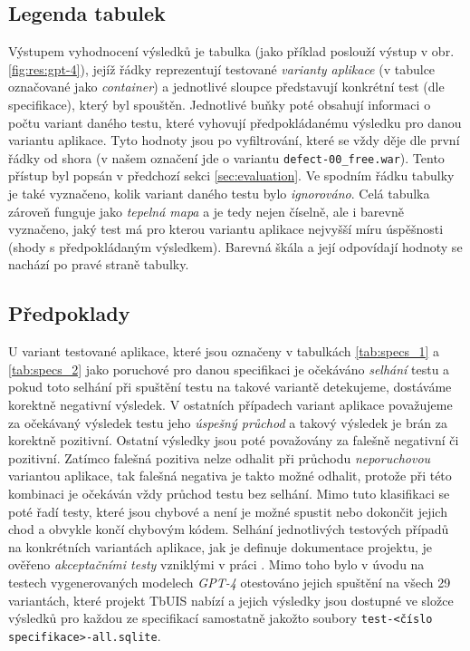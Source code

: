 \documentclass[czech, ma, kiv, he, iso690numb, pdf, viewonly]{fasthesis}
\begin{document}
        \subsection{Legenda tabulek} \label{sec:plot_legend}

        Výstupem vyhodnocení výsledků je tabulka (jako příklad poslouží výstup v obr. \ref{fig:res:gpt-4}), jejíž řádky reprezentují testované \textit{varianty aplikace} (v tabulce označované jako \emph{container}) a jednotlivé sloupce představují konkrétní test (dle specifikace), který byl spouštěn. Jednotlivé buňky poté obsahují informaci o počtu variant daného testu, které vyhovují předpokládanému výsledku pro danou variantu aplikace. Tyto hodnoty jsou po vyfiltrování, které se vždy děje dle první řádky od shora (v našem označení jde o variantu \verb|defect-00_free.war|). Tento přístup byl popsán v předchozí sekci \ref{sec:evaluation}. Ve spodním řádku tabulky je také vyznačeno, kolik variant daného testu bylo \emph{ignorováno}. Celá tabulka zároveň funguje jako \textit{tepelná mapa} a je tedy nejen číselně, ale i barevně vyznačeno, jaký test má pro kterou variantu aplikace nejvyšší míru úspěšnosti (shody s předpokládaným výsledkem). Barevná škála a její odpovídají hodnoty se nachází po pravé straně tabulky.

        \subsection{Předpoklady}

        U variant testované aplikace, které jsou označeny v tabulkách \ref{tab:specs_1} a \ref{tab:specs_2} jako poruchové pro danou specifikaci je očekáváno \textit{selhání} testu a pokud toto selhání při spuštění testu na takové variantě detekujeme, dostáváme korektně negativní výsledek. V ostatních případech variant aplikace považujeme za očekávaný výsledek testu jeho \textit{úspešný průchod} a takový výsledek je brán za korektně pozitivní. Ostatní výsledky jsou poté považovány za falešně negativní či pozitivní. Zatímco falešná pozitiva nelze odhalit při průchodu \textit{neporuchovou} variantou aplikace, tak falešná negativa je takto možné odhalit, protože při této kombinaci je očekáván vždy průchod testu bez selhání. Mimo tuto klasifikaci se poté řadí testy, které jsou chybové a není je možné spustit nebo dokončit jejich chod a obvykle končí chybovým kódem. Selhání jednotlivých testových případů na konkrétních variantách aplikace, jak je definuje dokumentace projektu, je ověřeno \textit{akceptačními testy} vzniklými v práci \cite{Vais2020}. Mimo toho bylo v úvodu na testech vygenerovaných modelech \textit{GPT-4} otestováno jejich spuštění na všech 29 variantách, které projekt TbUIS nabízí a jejich výsledky jsou dostupné ve složce výsledků pro každou ze specifikací samostatně jakožto soubory \verb|test-<číslo specifikace>-all.sqlite|. 
\end{document}
